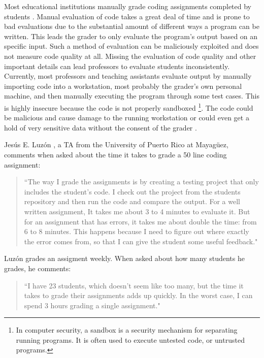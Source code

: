 
Most educational institutions manually grade coding assignments completed by
students \cite{Cheang2003}. Manual evaluation of code takes a great deal of time
and is prone to bad evaluations due to the substantial amount of different ways
a program can be written. This leads the grader to only evaluate the program's
output based on an specific input. Such a method of evaluation can be
maliciously exploited and does not measure code quality at all. Missing the
evaluation of code quality and other important details can lead professors to
evaluate students inconsistently. Currently, most professors and teaching
assistants evaluate output by manually importing code into a workstation, most
probably the grader's own personal machine, and then manually executing the
program through some test cases. This is highly insecure because the code is not
properly sandboxed \footnote{In computer security, a sandbox is a security
mechanism for separating running programs. It is often used to execute untested
code, or untrusted programs.}. The code could be malicious and cause damage to
the running workstation or could even get a hold of very sensitive data without
the consent of the grader \cite{Cheang2003}.

Jesús E. Luzón \cite{Chiki}, a TA from the University of Puerto Rico at
Mayagüez, comments when asked about the time it takes to grade a 50 line coding
assignment: \begin{quote} ``The way I grade the assignments is by creating a
testing project that only includes the student's code. I check out the project
from the students repository and then run the code and compare the output. For a
well written assignment, It takes me about 3 to 4 minutes to evaluate it. But
for an assignment that has errors, it takes me about double the time: from 6 to
8 minutes. This happens because I need to figure out where exactly the error
comes from, so that I can give the student some useful feedback." \end{quote}
Luzón grades an assigment weekly. When asked about how many students he grades,
he comments: \begin{quote} ``I have 23 students, which doesn't seem like too
many, but the time it takes to grade their assignments adds up quickly. In the
worst case, I can spend 3 hours grading a single assignment." \end{quote}


